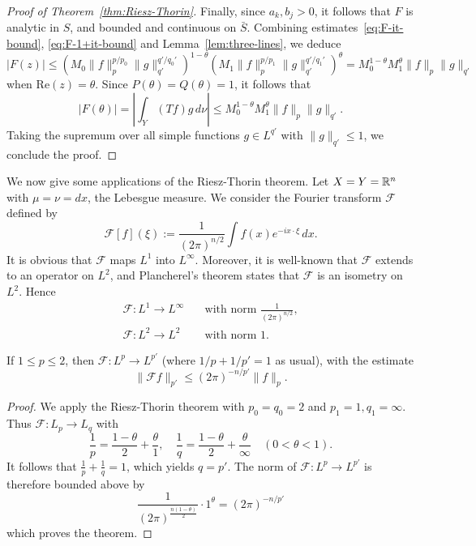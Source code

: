 \begin{proof}[Proof of Theorem~\ref{thm:Riesz-Thorin}]
Finally, since $a_k,b_j>0$, it follows that $F$ is analytic in $S$, and bounded and continuous on $\bar{S}$. Combining estimates~\eqref{eq:F-it-bound}, \eqref{eq:F-1+it-bound} and Lemma~\ref{lem:three-lines}, we deduce
\begin{equation*}
    |F(z)|\le \left(M_0\|f\|_p^{p/p_0}\|g\|_{q'}^{q'/q_0'}\right)^{1-\theta} \left(M_1\|f\|_p^{p/p_1}\|g\|_{q'}^{q'/q_1'}\right)^\theta = M_0^{1-\theta}M_1^\theta \|f\|_p\|g\|_{q'}
\end{equation*}
when $\mathrm{Re}(z)=\theta$. Since $P(\theta)=Q(\theta)=1$, it follows that
\begin{equation*}
    |F(\theta)|= \left|\int_Y (Tf)g\,d\nu\right| \le M_0^{1-\theta}M_1^\theta \|f\|_p\|g\|_{q'}.
\end{equation*}
Taking the supremum over all simple functions $g\in L^{q'}$ with $\|g\|_{q'}\le 1$, we conclude the proof.
\end{proof}

We now give some applications of the Riesz-Thorin theorem. Let $X=Y=\mathbb{R}^n$ with $\mu=\nu=dx$, the Lebesgue measure. We consider the Fourier transform $\mathcal{F}$ defined by
\begin{equation*}
    \mathcal{F}[f](\xi):=\frac{1}{(2\pi)^{n/2}}\int f(x)e^{-ix\cdot\xi}\,dx.
\end{equation*}
It is obvious that $\mathcal{F}$ maps $L^1$ into $L^\infty$. Moreover, it is well-known that $\mathcal{F}$ extends to an operator on $L^2$, and Plancherel's theorem states that $\mathcal{F}$ is an isometry on $L^2$. Hence
\begin{align*}
    \mathcal{F}:L^1 \to L^\infty \quad & \text{with norm }\frac{1}{(2\pi)^{n/2}}, \\
    \mathcal{F}:L^2 \to L^2 \quad & \text{with norm }1.
\end{align*}

\begin{theorem}
If $1\le p\le 2$, then $\mathcal{F}:L^p\to L^{p'}$ (where $1/p+1/p'=1$ as usual), with the estimate
\begin{equation}
    \|\mathcal{F}f\|_{p'} \le (2\pi)^{-n/p'}\|f\|_p.
\end{equation}
\end{theorem}

\begin{proof}
We apply the Riesz-Thorin theorem with $p_0=q_0=2$ and $p_1=1,q_1=\infty$. Thus $\mathcal{F}:L_p \to L_q$ with
\begin{equation*}
    \frac{1}{p}=\frac{1-\theta}{2}+\frac{\theta}{1}, \quad \frac{1}{q}=\frac{1-\theta}{2}+\frac{\theta}{\infty} \quad (0<\theta<1).
\end{equation*}
It follows that $\frac{1}{p}+\frac{1}{q}=1$, which yields $q=p'$. The norm of $\mathcal{F}:L^p\to L^{p'}$ is therefore bounded above by
\begin{equation*}
    \frac{1}{(2\pi)^{\frac{n(1-\theta)}{2}}}\cdot 1^{\theta} = (2\pi)^{-n/p'}
\end{equation*}
which proves the theorem.
\end{proof}

